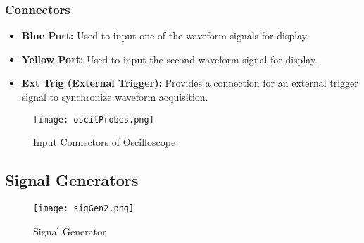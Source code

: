 \documentclass[12pt]{article}
\begin{document}
\subsubsection*{Connectors}
\begin{itemize}
    \item[] \textbf{Blue Port:} Used to input one of the waveform signals for display.
    \item[] \textbf{Yellow Port:} Used to input the second waveform signal for display.
    \item[] \textbf{Ext Trig (External Trigger):} Provides a connection for an external trigger signal to synchronize waveform acquisition.
\end{itemize}

\begin{figure}[H]
    \centering
    \texttt{[image: oscilProbes.png]}
    \caption{Input Connectors of Oscilloscope}
\end{figure}

\subsection*{Signal Generators}

\begin{figure}[H]
    \centering
    \texttt{[image: sigGen2.png]}
    \caption{Signal Generator}
\end{figure}
\end{document}
